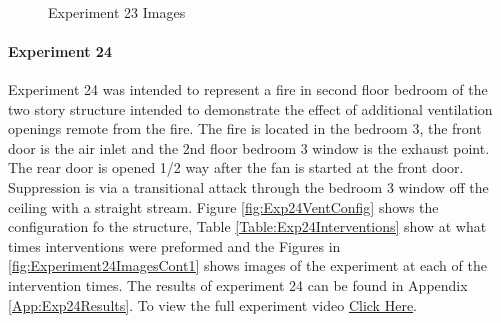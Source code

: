 \documentclass{article}
\begin{document}
\begin{figure}[H]
	\ContinuedFloat 
	\centering 
	 \ 
	\caption{Experiment 23 Images}
	\label{fig:Experiment23ImagesCont3} 
\end{figure}

\paragraph{Experiment 24}\mbox{}

Experiment 24 was intended to represent a fire in second floor bedroom of the two story structure intended to demonstrate the effect of additional ventilation openings remote from the fire. The fire is located in the bedroom 3, the front door is the air inlet and the 2nd floor bedroom 3 window is the exhaust point. The rear door is opened 1/2 way after the fan is started at the front door. Suppression is via a transitional attack through the bedroom 3 window off the ceiling with a straight stream. Figure \ref{fig:Exp24VentConfig} shows the configuration fo the structure, Table \ref{Table:Exp24Interventions} show at what times interventions were preformed and the Figures in \ref{fig:Experiment24ImagesCont1} shows images of the experiment at each of the intervention times. The results of experiment 24 can be found in Appendix \ref{App:Exp24Results}. To view the full experiment video \href{https://youtu.be/T430FepUd4E}{Click Here}.
\end{document}
